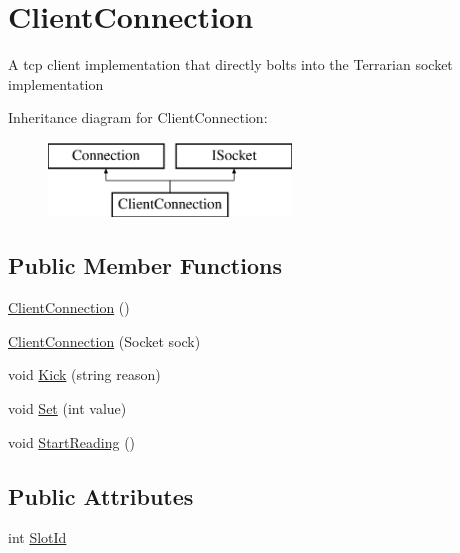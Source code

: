 \hypertarget{classOTA_1_1Sockets_1_1ClientConnection}{}\section{Client\+Connection}
\label{classOTA_1_1Sockets_1_1ClientConnection}


A tcp client implementation that directly bolts into the Terrarian socket implementation  


Inheritance diagram for Client\+Connection\+:\begin{figure}[H]
\begin{center}
\leavevmode
\includegraphics[height=2.000000cm]{classOTA_1_1Sockets_1_1ClientConnection}
\end{center}
\end{figure}
\subsection*{Public Member Functions}
\begin{DoxyCompactItemize}
\item 
\hyperlink{classOTA_1_1Sockets_1_1ClientConnection_ab85319c2bae079de4a02e80406de2b23}{Client\+Connection} ()
\item 
\hyperlink{classOTA_1_1Sockets_1_1ClientConnection_ae2e14437631840d632d266c1d38a218c}{Client\+Connection} (Socket sock)
\item 
void \hyperlink{classOTA_1_1Sockets_1_1ClientConnection_a32f7881210dab5b3e54ea15043642953}{Kick} (string reason)
\item 
void \hyperlink{classOTA_1_1Sockets_1_1ClientConnection_a8ed097593986737546a55270b67ad52a}{Set} (int value)
\item 
void \hyperlink{classOTA_1_1Sockets_1_1ClientConnection_a8a2fd16e72e1ae76dbeea19e5a5c07c9}{Start\+Reading} ()
\end{DoxyCompactItemize}
\subsection*{Public Attributes}
\begin{DoxyCompactItemize}
\item 
int \hyperlink{classOTA_1_1Sockets_1_1ClientConnection_a635112a22f99c54b0fad66a41fae1c6e}{Slot\+Id}
\end{DoxyCompactItemize}
